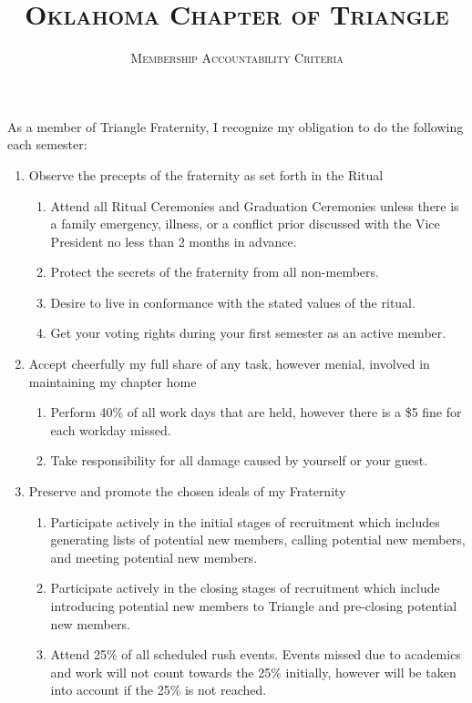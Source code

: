 \documentclass{article}
\title{\textsc{Oklahoma Chapter of Triangle}}
\subtitle{\textsc{Membership Accountability Criteria}}
\begin{document}
\maketitle

\setlength\parindent{0pt}

As a member of Triangle Fraternity, I recognize my obligation to do the following each semester:

\begin{enumerate}
    \item Observe the precepts of the fraternity as set forth in the Ritual
    \begin{enumerate}
        \item Attend all Ritual Ceremonies and Graduation Ceremonies unless there is a family emergency, illness, or a conflict prior discussed with the Vice President no less than 2 months in advance.
        \item Protect the secrets of the fraternity from all non-members.
        \item Desire to live in conformance with the stated values of the ritual.
        \item Get your voting rights during your first semester as an active member.
    \end{enumerate}
    \item Accept cheerfully my full share of any task, however menial, involved in maintaining my chapter home
    \begin{enumerate}
        \item Perform 40\% of all work days that are held, however there is a \$5 fine for each workday missed.
        \item Take responsibility for all damage caused by yourself or your guest.
    \end{enumerate}
    \item Preserve and promote the chosen ideals of my Fraternity
    \begin{enumerate}
        \item Participate actively in the initial stages of recruitment which includes generating lists of potential new members, calling potential new members, and meeting potential new members.
        \item Participate actively in the closing stages of recruitment which include introducing potential new members to Triangle and pre-closing potential new members.
        \item Attend 25\% of all scheduled rush events. Events missed due to academics and work will not count towards the 25\% initially, however will be taken into account if the 25\% is not reached.

\end{enumerate}
\end{enumerate}
\end{document}
